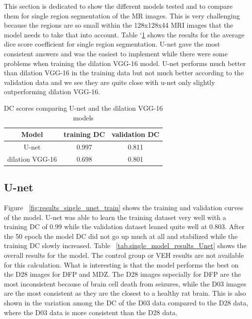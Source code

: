     This section is dedicated to show the different models tested and to compare them for single region segmentation of the MR images. 
    This is very challenging because the regions are so small within the 128x128x44 MRI images that the model needs to take that into account. 
    Table `\ref{tab.single_model_results} shows the results for the average dice score coefficient for single region segmentation.
    U-net gave the most consistent answers and was the easiest to implement while there were some problems when training the dilation VGG-16 model.
    U-net performs much better than dilation VGG-16 in the training data but not much better according to the validation data and we see they are quite close with u-net only slightly outperforming dilation VGG-16. 
    
\begin{table}[tbh]
\renewcommand{\arraystretch}{1}
\centering
\begin{tabular}{|c|c|c|}
\hline
\textbf{Model} & \textbf{training DC} & \textbf{validation DC}\\
\hline
U-net & 0.997 & 0.811\\ %
\hline
dilation VGG-16 & 0.698 & 0.801\\ %
\hline
\end{tabular}
\caption{DC scores comparing U-net and the dilation VGG-16 models}
\label{tab.single_model_results}
\end{table}


\subsection{U-net}
    Figure ~\ref{fig:results_single_unet_train} shows the training and validation curves of the model. 
    U-net was able to learn the training dataset very well with a training DC of 0.99 while the validation dataset leaned quite well at 0.803.
    After the 50 epoch the model DC did not go up much at all and stabilized while the training DC slowly increased.
    Table ~\ref{tab.single_model_results_Unet} shows the overall results for the model. 
    The control group or VEH results are not available for this calculation.
    What is interesting is that the model performs the best on the D28 images for DFP and MDZ. 
    The D28 images especially for DFP are the most inconsistent because of brain cell death from seizures, while the D03 images are the most consistent as they are the closest to a healthy rat brain. 
    This is also shown in the variation among the DC of the D03 data compared to the D28 data, where the D03 data is more consistent than the D28 data. 
    
